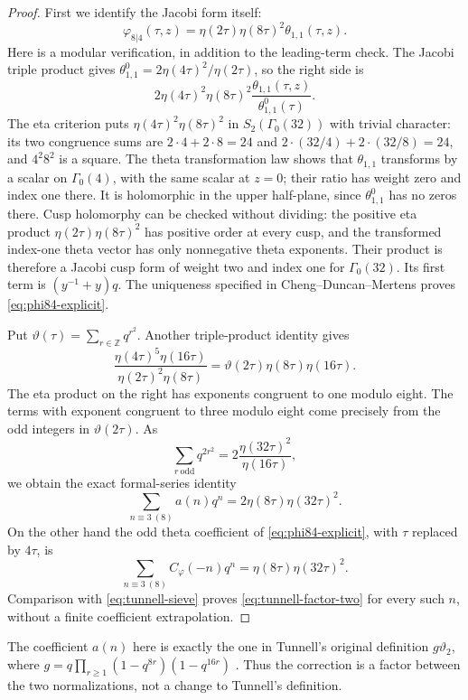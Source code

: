 \begin{proof}
First we identify the Jacobi form itself:
\begin{equation}\label{eq:phi84-explicit}
 \varphi_{8|4}(\tau,z)
   =\eta(2\tau)\eta(8\tau)^2\theta_{1,1}(\tau,z).
\end{equation}
Here is a modular verification, in addition to the leading-term check.
The Jacobi triple product gives
$\theta^0_{1,1}=2\eta(4\tau)^2/\eta(2\tau)$, so the right side is
\[
 2\eta(4\tau)^2\eta(8\tau)^2
    \frac{\theta_{1,1}(\tau,z)}{\theta^0_{1,1}(\tau)}.
\]
The eta criterion puts $\eta(4\tau)^2\eta(8\tau)^2$ in
$S_2(\Gamma_0(32))$ with trivial character: its two congruence sums are
$2\cdot4+2\cdot8=24$ and $2\cdot(32/4)+2\cdot(32/8)=24$,
and $4^2 8^2$ is a square.  The theta transformation law shows that
$\theta_{1,1}$ transforms by a scalar on $\Gamma_0(4)$, with the same
scalar at $z=0$; their ratio has weight zero and index one there.
It is holomorphic in the upper half-plane, since $\theta^0_{1,1}$ has
no zeros there.  Cusp holomorphy can be checked without dividing:
the positive eta product $\eta(2\tau)\eta(8\tau)^2$ has positive order
at every cusp, and the transformed index-one theta vector has only
nonnegative theta exponents.  Their product is therefore a Jacobi cusp
form of weight two and index one for $\Gamma_0(32)$.
Its first term is $(y^{-1}+y)q$.  The uniqueness specified in
Cheng--Duncan--Mertens \cite[equation~(4.2.9)]{CDM2025} proves \eqref{eq:phi84-explicit}.

Put $\vartheta(\tau)=\sum_{r\in\mathbb Z}q^{r^2}$.
Another triple-product identity gives
\[
 \frac{\eta(4\tau)^5\eta(16\tau)}{\eta(2\tau)^2\eta(8\tau)}
   =\vartheta(2\tau)\eta(8\tau)\eta(16\tau).
\]
The eta product on the right has exponents congruent to one modulo eight.
The terms with exponent congruent to three modulo eight come precisely
from the odd integers in $\vartheta(2\tau)$.  As
\[
 \sum_{r\ \mathrm{odd}}q^{2r^2}
    =2\frac{\eta(32\tau)^2}{\eta(16\tau)},
\]
we obtain the exact formal-series identity
\begin{equation}\label{eq:tunnell-sieve}
 \sum_{n\equiv3\ (8)}a(n)q^n=2\eta(8\tau)\eta(32\tau)^2.
\end{equation}
On the other hand the odd theta coefficient of
\eqref{eq:phi84-explicit}, with $\tau$ replaced by $4\tau$, is
\[
 \sum_{n\equiv3\ (8)} C_{\varphi}(-n)q^n
   =\eta(8\tau)\eta(32\tau)^2.
\]
Comparison with \eqref{eq:tunnell-sieve} proves
\eqref{eq:tunnell-factor-two} for every such $n$, without a finite
coefficient extrapolation.
\end{proof}

The coefficient $a(n)$ here is exactly the one in Tunnell's original
definition $g\vartheta_2$, where
$g=q\prod_{r\geq1}(1-q^{8r})(1-q^{16r})$
\cite[p.~323]{Tunnell1983}.  Thus the correction is a factor between the
two normalizations, not a change to Tunnell's definition.
